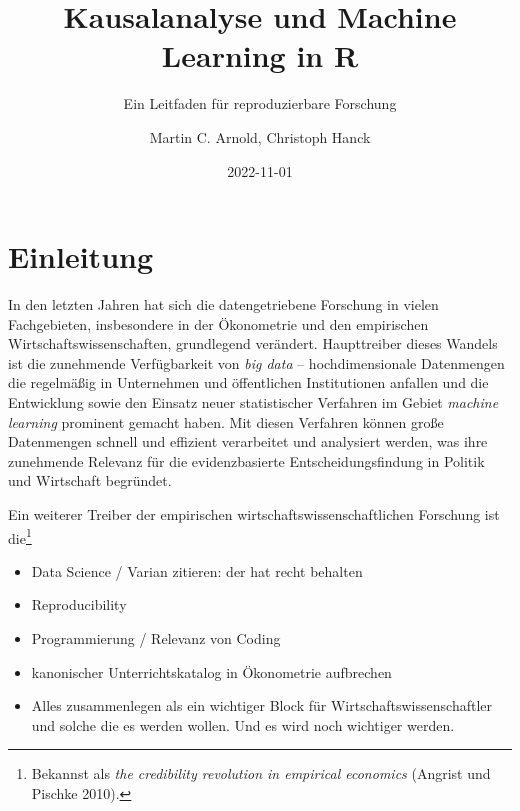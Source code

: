 \documentclass[
  letterpaper,
  DIV=11,
  oneside]{scrreprt}
\title{Kausalanalyse und Machine Learning in R}
\subtitle{Ein Leitfaden für reproduzierbare Forschung}
\author{Martin C. Arnold, Christoph Hanck}
\date{2022-11-01}
\renewcommand*\contentsname{Inhaltsverzeichnis}
\newcommand\contentsname{Inhaltsverzeichnis}
\begin{document}
\maketitle
\ifdefined\Shaded\renewenvironment{Shaded}{\begin{tcolorbox}[breakable, interior hidden, enhanced, sharp corners, boxrule=0pt, borderline west={3pt}{0pt}{shadecolor}, frame hidden]}{\end{tcolorbox}}\fi

\renewcommand*\contentsname{Inhaltsverzeichnis}
{
\hypersetup{linkcolor=}
\setcounter{tocdepth}{2}
\tableofcontents
}

\hypertarget{einleitung}{%
\chapter*{Einleitung}\label{einleitung}}


In den letzten Jahren hat sich die datengetriebene Forschung in vielen
Fachgebieten, insbesondere in der Ökonometrie und den empirischen
Wirtschaftswissenschaften, grundlegend verändert. Haupttreiber dieses
Wandels ist die zunehmende Verfügbarkeit von \emph{big data} --
hochdimensionale Datenmengen die regelmäßig in Unternehmen und
öffentlichen Institutionen anfallen und die Entwicklung sowie den
Einsatz neuer statistischer Verfahren im Gebiet \emph{machine learning}
prominent gemacht haben. Mit diesen Verfahren können große Datenmengen
schnell und effizient verarbeitet und analysiert werden, was ihre
zunehmende Relevanz für die evidenzbasierte Entscheidungsfindung in
Politik und Wirtschaft begründet.

Ein weiterer Treiber der empirischen wirtschaftswissenschaftlichen
Forschung ist die\footnote{Bekannst als \emph{the credibility revolution
  in empirical economics} (Angrist und Pischke 2010).}

\begin{itemize}
\item
  Data Science / Varian zitieren: der hat recht behalten
\item
  Reproducibility
\item
  Programmierung / Relevanz von Coding
\item
  kanonischer Unterrichtskatalog in Ökonometrie aufbrechen
\item
  Alles zusammenlegen als ein wichtiger Block für
  Wirtschaftswissenschaftler und solche die es werden wollen. Und es
  wird noch wichtiger werden.
\end{itemize}
\end{document}
